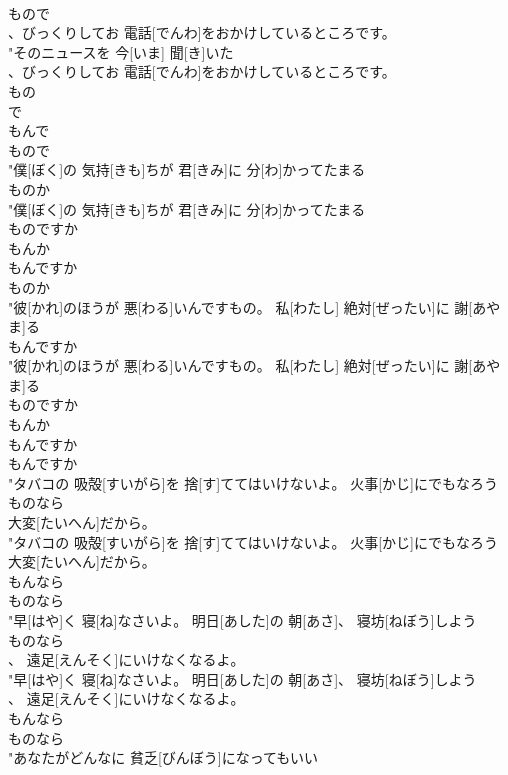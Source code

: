 \documentclass[8pt]{extreport}
\begin{document}
\begin{CJK}{UTF8}{min}
\\	もので
\\	、びっくりしてお 電話[でんわ]をおかけしているところです。
\\	"そのニュースを 今[いま] 聞[き]いた
\\	、びっくりしてお 電話[でんわ]をおかけしているところです。
\\	もの 
\\	で 
\\	もんで 
\\	もので
\\	"僕[ぼく]の 気持[きも]ちが 君[きみ]に 分[わ]かってたまる
\\	ものか
\\	"僕[ぼく]の 気持[きも]ちが 君[きみ]に 分[わ]かってたまる
\\	ものですか 
\\	もんか 
\\	もんですか	
\\	ものか
\\	"彼[かれ]のほうが 悪[わる]いんですもの。 私[わたし] 絶対[ぜったい]に 謝[あやま]る
\\	もんですか
\\	"彼[かれ]のほうが 悪[わる]いんですもの。 私[わたし] 絶対[ぜったい]に 謝[あやま]る
\\	ものですか 
\\	もんか 
\\	もんですか	
\\	もんですか
\\	"タバコの 吸殻[すいがら]を 捨[す]ててはいけないよ。 火事[かじ]にでもなろう
\\	ものなら
\\	大変[たいへん]だから。
\\	"タバコの 吸殻[すいがら]を 捨[す]ててはいけないよ。 火事[かじ]にでもなろう
\\	大変[たいへん]だから。
\\	もんなら 
\\	ものなら
\\	"早[はや]く 寝[ね]なさいよ。 明日[あした]の 朝[あさ]、 寝坊[ねぼう]しよう
\\	ものなら
\\	、 遠足[えんそく]にいけなくなるよ。
\\	"早[はや]く 寝[ね]なさいよ。 明日[あした]の 朝[あさ]、 寝坊[ねぼう]しよう
\\	、 遠足[えんそく]にいけなくなるよ。
\\	もんなら 
\\	ものなら
\\	"あなたがどんなに 貧乏[びんぼう]になってもいい

\end{CJK}
\end{document}
